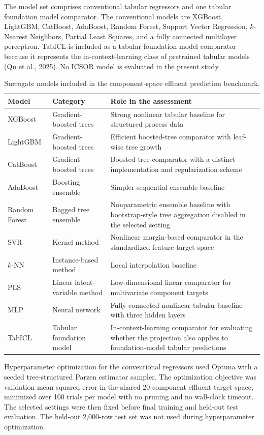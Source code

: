 \documentclass[a4paper,fleqn]{cas-sc}
\begin{document}
The model set comprises conventional tabular regressors and one tabular foundation model comparator. The conventional models are XGBoost, LightGBM, CatBoost, AdaBoost, Random Forest, Support Vector Regression, $k$-Nearest Neighbors, Partial Least Squares, and a fully connected multilayer perceptron. TabICL is included as a tabular foundation model comparator because it represents the in-context-learning class of pretrained tabular models (Qu et al., 2025). No ICSOR model is evaluated in the present study.

\begin{table}[htbp]
\centering
\caption{Surrogate models included in the component-space effluent prediction benchmark.}
\label{tab:surrogate_models}
\scriptsize
\begin{tabular}{p{2.5cm}p{3.2cm}p{5.6cm}}
\hline
Model & Category & Role in the assessment \\
\hline
XGBoost & Gradient-boosted trees & Strong nonlinear tabular baseline for structured process data \\
LightGBM & Gradient-boosted trees & Efficient boosted-tree comparator with leaf-wise tree growth \\
CatBoost & Gradient-boosted trees & Boosted-tree comparator with a distinct implementation and regularization scheme \\
AdaBoost & Boosting ensemble & Simpler sequential ensemble baseline \\
Random Forest & Bagged tree ensemble & Nonparametric ensemble baseline with bootstrap-style tree aggregation disabled in the selected setting \\
SVR & Kernel method & Nonlinear margin-based comparator in the standardized feature-target space \\
$k$-NN & Instance-based method & Local interpolation baseline \\
PLS & Linear latent-variable method & Low-dimensional linear comparator for multivariate component targets \\
MLP & Neural network & Fully connected nonlinear tabular baseline with three hidden layers \\
TabICL & Tabular foundation model & In-context-learning comparator for evaluating whether the projection also applies to foundation-model tabular predictions \\
\hline
\end{tabular}
\end{table}

Hyperparameter optimization for the conventional regressors used Optuna with a seeded tree-structured Parzen estimator sampler. The optimization objective was validation mean squared error in the shared 20-component effluent target space, minimized over 100 trials per model with no pruning and no wall-clock timeout. The selected settings were then fixed before final training and held-out test evaluation. The held-out 2,000-row test set was not used during hyperparameter optimization.
\end{document}
